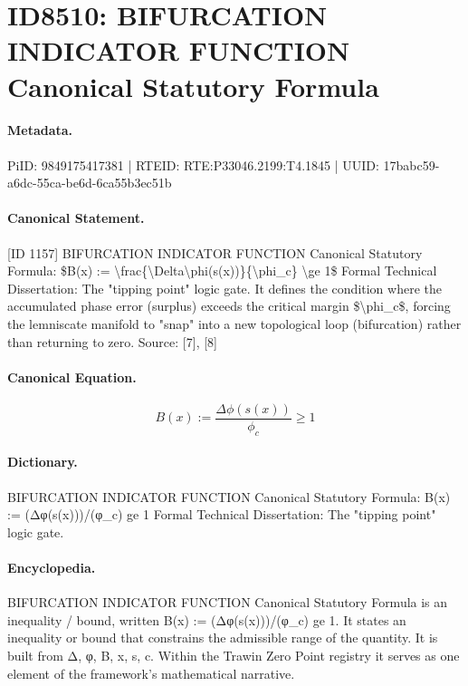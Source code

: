 \section*{ID8510: BIFURCATION INDICATOR FUNCTION Canonical Statutory Formula}
\paragraph{Metadata.}
PiID: 9849175417381 | RTEID: RTE:P33046.2199:T4.1845 | UUID: 17babc59-a6dc-55ca-be6d-6ca55b3ec51b

\paragraph{Canonical Statement.}
[ID 1157] BIFURCATION INDICATOR FUNCTION Canonical Statutory Formula: \$B(x) := \textbackslash{}frac\{\textbackslash{}Delta\textbackslash{}phi(s(x))\}\{\textbackslash{}phi\_c\} \textbackslash{}ge 1\$ Formal Technical Dissertation: The "tipping point" logic gate. It defines the condition where the accumulated phase error (surplus) exceeds the critical margin \$\textbackslash{}phi\_c\$, forcing the lemniscate manifold to "snap" into a new topological loop (bifurcation) rather than returning to zero. Source: [7], [8]

\paragraph{Canonical Equation.}
\[
B(x) := \frac{\Delta\phi(s(x))}{\phi_c} \ge 1
\]

\paragraph{Dictionary.}
BIFURCATION INDICATOR FUNCTION Canonical Statutory Formula: B(x) := (Δφ(s(x)))/(φ\_c) ge 1 Formal Technical Dissertation: The "tipping point" logic gate.

\paragraph{Encyclopedia.}
BIFURCATION INDICATOR FUNCTION Canonical Statutory Formula is an inequality / bound, written B(x) := (Δφ(s(x)))/(φ\_c) ge 1. It states an inequality or bound that constrains the admissible range of the quantity. It is built from Δ, φ, B, x, s, c. Within the Trawin Zero Point registry it serves as one element of the framework's mathematical narrative.

